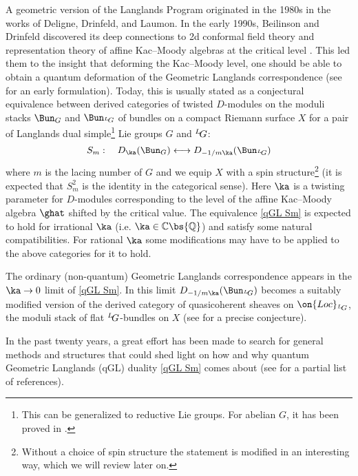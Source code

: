 \documentclass[11pt,reqno]{amsart}
\theoremstyle{plain}
\numberwithin{equation}{section}
\newcommand{\C}{\mathbb{C}}
\def\neg{\negthinspace}
\def\LG{{}^L\neg G}
\theoremstyle{definition}
\begin{document}
A geometric version of the Langlands Program originated in the 1980s
in the works of Deligne, Drinfeld, and Laumon. In the early 1990s,
Beilinson and Drinfeld discovered its deep connections to 2d conformal
field theory and representation theory of affine Kac--Moody algebras at
the critical level \cite{BD}. This led them to the insight that
deforming the Kac--Moody level, one should be able to obtain a quantum
deformation of the Geometric Langlands correspondence (see \cite{St}
for an early formulation). Today, this is usually stated as a
conjectural equivalence between derived categories of twisted
$D$-modules on the moduli stacks $\Bun_G$ and $\Bun_{\LG}$ of bundles
on a compact Riemann surface $X$ for a pair of Langlands dual
simple\footnote{This can be generalized to reductive Lie groups. For
  abelian $G$, it has been proved in \cite{PR}.} Lie groups $G$ and
$\LG$:
\begin{equation}    \label{qGL Sm}
S_m: \quad D_\ka(\Bun_G) \longleftrightarrow
D_{-1/m \ka}(\Bun_{\LG})
\end{equation}
where $m$ is the lacing number of $G$ and we equip $X$ with a spin
structure\footnote{Without a choice of spin structure the statement is
  modified in an interesting way, which we will review later on.} (it
is expected that $S_m^2$ is the identity in the categorical
sense). Here $\ka$ is a twisting parameter for $D$-modules
corresponding to the level of the affine Kac--Moody algebra $\ghat$
shifted by the critical value. The equivalence \eqref{qGL Sm} is
expected to hold for irrational $\ka$ (i.e. $\ka \in \C \bs {\mathbb
  Q}$) and satisfy some natural compatibilities. For rational $\ka$
some modifications may have to be applied to the above categories for
it to hold.

The ordinary (non-quantum) Geometric Langlands correspondence appears
in the $\ka \to 0$ limit of \eqref{qGL Sm}. In this limit $D_{-1/m
  \ka}(\Bun_{\LG})$ becomes a suitably modified version of the derived
category of quasicoherent sheaves on $\on{Loc}_{\LG}$, the moduli
stack of flat $\LG$-bundles on $X$ (see \cite{AG} for a precise
conjecture).

In the past twenty years, a great effort has been made to search for
general methods and structures that could shed light on how and why
quantum Geometric Langlands (qGL) duality \eqref{qGL Sm} comes about
(see \cite{Frenkel1,KW,Kapustin,JT,gaitsW,gaitsQ,Ga1,Ga2,CG,AFO}
for a partial list of references).
\end{document}
